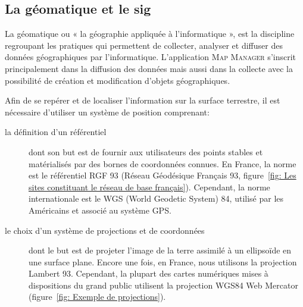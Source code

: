 \documentclass{rapportUHA40}
\begin{document}
\subsection{La géomatique et le \gls{sig}}
La géomatique ou « la géographie appliquée à l'informatique », est la
discipline regroupant les pratiques qui permettent de collecter, analyser et
diffuser des données géographiques par l'informatique. L'application
\textsc{Map Manager} s'inscrit principalement dans la diffusion des données
mais aussi dans la collecte avec la possibilité de création et modification
d'objets géographiques.

Afin de se repérer et de localiser l'information sur la surface terrestre, il
est nécessaire d'utiliser un système de position comprenant:
\begin{description}
  \item[la définition d'un référentiel] dont son but est de fournir aux utilisateurs
    des points stables et matérialisés par des bornes de coordonnées connues. En
    France, la norme est le référentiel RGF 93 (Réseau Géodésique Français 93,
    figure~\ref{fig: Les sites constituant le réseau de base français}). Cependant,
    la norme internationale est le WGS (World Geodetic System) 84, utilisé par les
    Américains et associé au système GPS\@.

  \item[le choix d'un système de projections et de coordonnées] dont le but est de
    projeter l'image de la terre assimilé à un ellipsoïde en une surface plane.
    Encore une fois, en France, nous utilisons la projection Lambert 93. Cependant,
    la plupart des cartes numériques mises à dispositions du grand public utilisent
    la projection WGS84 Web Mercator (figure~\ref{fig: Exemple de projections}).
\end{description}

\end{document}
